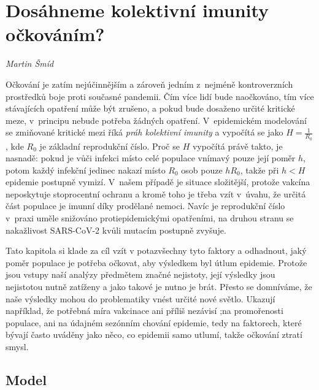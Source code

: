 
\chapter{Dosáhneme kolektivní imunity o\v{c}kováním?} \label{Nekolik_poznamek}

\textit{Martin Šmíd}
\vspace{15mm}

\noindent Očkování je zatím nejúčinnějším a zároveň jedním z~nejméně kontroverzních pro\-střed\-ků boje proti současné pandemii. Čím více lidí bude naočkováno,
tím více stávajících opatření může být zrušeno, a pokud bude dosaženo určité kritické meze, v~principu nebude potřeba žádných opatření. V~epidemickém modelování se zmi\-ňo\-va\-né kritické mezi říká {\em práh kolektivní imunity} a vypočítá se jako $H=\frac{1}{R_0}$, kde $R_0$ je základní reprodukční číslo. Proč se $H$ vypočítá právě takto, je nasnadě: pokud je vůči infekci místo celé populace vnímavý pouze její poměr $h$, potom každý infekční jedinec nakazí místo $R_0$ osob pouze $h R_0$, takže při $h < H$ epidemie postupně vymizí. V~našem případě je situace složitější, protože vakcína neposkytuje stoprocentní ochranu a kromě toho je třeba vzít v~úvahu, že určitá část populace je imunní díky prodělané nemoci. Navíc je reprodukční číslo v~praxi uměle snižováno protiepidemickými opatřeními, na druhou stranu se nakažlivost SARS-CoV-2 kvůli mutacím postupně zvyšuje. 

Tato kapitola si klade za cíl vzít v potazvšechny tyto faktory a odhadnout, jaký poměr populace je potřeba očkovat, aby výsledkem byl útlum epidemie.
Protože jsou vstupy naší analýzy předmětem značné nejistoty, její výsledky jsou nejistotou nutně zatíženy a jako takové je nutno je brát. Přesto se domníváme, že naše výsledky mohou do problematiky vnést určité nové světlo. Ukazují například, že potřebná míra vakcinace ani příliš nezávisí
;na promořenosti populace, ani na údajném sezónním chování epidemie,
tedy na faktorech, které bývají často uváděny jako něco, co epidemii samo utlumí, takže očkování ztratí smysl.

\section*{Model}

